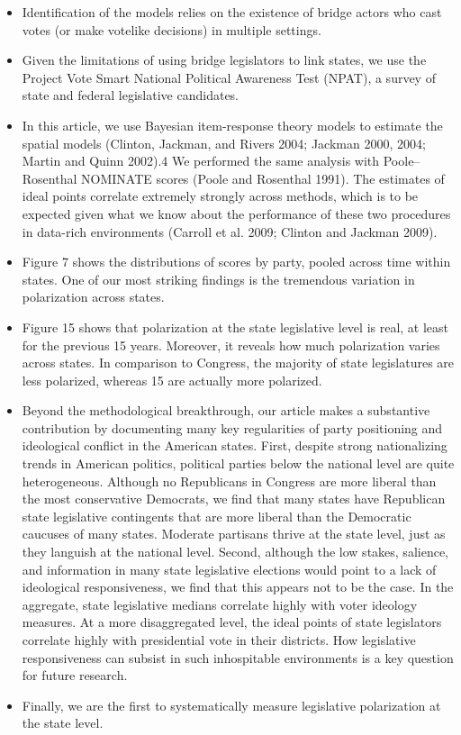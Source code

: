 \documentclass[a4paper,12pt]{article}
\begin{document}
\begin{enumerate}
\begin{itemize}
\item Identification of the models relies on the existence of bridge actors who cast votes (or make votelike decisions) in multiple settings. 
\item Given the limitations of using bridge legislators to link states, we use the Project Vote Smart National Political Awareness Test (NPAT), a survey of state and federal legislative candidates. 
\item In this article, we use Bayesian item-response theory models to estimate the spatial models (Clinton, Jackman, and Rivers 2004; Jackman 2000, 2004; Martin and Quinn 2002).4 We performed the same analysis with Poole–Rosenthal NOMINATE scores (Poole and Rosenthal 1991). The estimates of ideal points correlate extremely strongly across methods, which is to be expected given what we know about the performance of these two procedures in data-rich environments (Carroll et al. 2009; Clinton and Jackman 2009). 
\item Figure 7 shows the distributions of scores by party, pooled across time within states. One of our most striking findings is the tremendous variation in polarization across states. 
\item Figure 15 shows that polarization at the state legislative level is real, at least for the previous 15 years. Moreover, it reveals how much polarization varies across states. In comparison to Congress, the majority of state legislatures are less polarized, whereas 15 are actually more polarized. 
\item Beyond the methodological breakthrough, our article makes a substantive contribution by documenting many key regularities of party positioning and ideological conflict in the American states. First, despite strong nationalizing trends in American politics, political parties below the national level are quite heterogeneous. Although no Republicans in Congress are more liberal than the most conservative Democrats, we find that many states have Republican state legislative contingents that are more liberal than the Democratic caucuses of many states. Moderate partisans thrive at the state level, just as they languish at the national level. Second, although the low stakes, salience, and information in many state legislative elections would point to a lack of ideological responsiveness, we find that this appears not to be the case. In the aggregate, state legislative medians correlate highly with voter ideology measures. At a more disaggregated level, the ideal points of state legislators correlate highly with presidential vote in their districts. How legislative responsiveness can subsist in such inhospitable environments is a key question for future research.  
\item Finally, we are the first to systematically measure legislative polarization at the state level. 
\end{itemize}


\end{enumerate}
\end{document}
